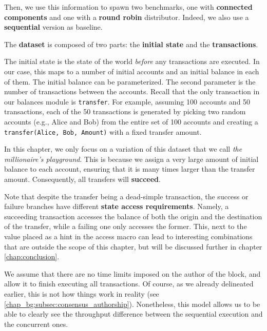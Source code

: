 Then, we use this information to spawn two benchmarks, one with \textbf{connected components} and
one with a \textbf{round robin} distributor. Indeed, we also use a \textbf{sequential} version as
baseline.

The \textbf{dataset} is composed of two parts: the \textbf{initial state} and the
\textbf{transactions}.

The initial state is the state of the world \textit{before} any transactions are executed. In our
case, this maps to a number of initial accounts and an initial balance in each of them. The initial
balance can be parameterized. The second parameter is the number of transactions between the
accounts. Recall that the only transaction in our balances module is \texttt{transfer}. For example,
assuming 100 accounts and 50 transactions, each of the 50 transactions is generated by picking two
random accounts (e.g., Alice and Bob) from the entire set of 100 accounts and creating a
\texttt{transfer(Alice, Bob, Amount)} with a fixed transfer amount.

In this chapter, we only focus on a variation of this dataset that we call \textit{the millionaire's
playground}. This is because we assign a very large amount of initial balance to each account,
ensuring that it is many times larger than the transfer amount. Consequently, all transfers will
\textbf{succeed}.

Note that despite the transfer being a dead-simple transaction, the success or failure branches have
different \textbf{state access requirements}. Namely, a succeeding transaction accesses the
balance of both the origin and the destination of the transfer, while a failing one only
accesses the former. This, next to the value placed as a hint in the access macro can lead to
interesting combinations that are outside the scope of this chapter, but will be discussed
further in chapter \ref{chap:conclusion}.

We assume that there are no time limits imposed on the author of the block, and allow it to finish
executing all transactions. Of course, as we already delineated earlier, this is not how things work
in reality (see \ref{chap_bg:subsec:consensus_authorship}). Nonetheless, this model allows us to be
able to clearly see the throughput difference between the sequential execution and the concurrent
ones.

